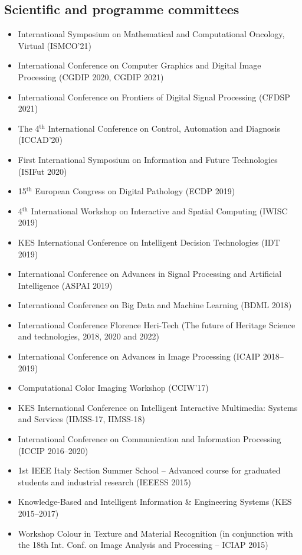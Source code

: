 \documentclass[11pt]{article}
\begin{document}
\subsection*{Scientific and programme committees}

\begin{itemize}
	\item International Symposium on Mathematical and Computational Oncology, Virtual (ISMCO'21)
	\item International Conference on Computer Graphics and Digital Image Processing (CGDIP 2020, CGDIP 2021)
	\item International Conference on Frontiers of Digital Signal Processing (CFDSP 2021)
  \item The 4$^\text{th}$ International Conference on Control, Automation and Diagnosis (ICCAD'20)
  \item First International Symposium on Information and Future Technologies (ISIFut 2020)
  \item 15$^\text{th}$ European Congress on Digital Pathology (ECDP 2019)
	\item 4$^\text{th}$ International Workshop on Interactive and Spatial Computing (IWISC 2019)
  \item KES International Conference on Intelligent Decision Technologies (IDT 2019)
  \item International Conference on Advances in Signal Processing and Artificial Intelligence (ASPAI 2019)
  \item International Conference on Big Data and Machine Learning (BDML 2018)
  \item International Conference Florence Heri-Tech (The future of Heritage Science and technologies, 2018, 2020 and 2022)
  \item International Conference on Advances in Image Processing (ICAIP 2018--2019)
  \item Computational Color Imaging Workshop (CCIW'17)
	\item KES International Conference on Intelligent Interactive Multimedia: Systems and Services (IIMSS-17, IIMSS-18)
  \item International Conference on Communication and Information Processing (ICCIP 2016--2020)
  \item 1st IEEE Italy Section Summer School – Advanced course for graduated students and industrial research (IEEESS 2015)
  \item Knowledge-Based and Intelligent Information \& Engineering Systems (KES 2015--2017)
  \item Workshop Colour in Texture and Material Recognition (in conjunction with the 18th Int. Conf. on Image Analysis and Processing – ICIAP 2015)

\end{itemize}
\end{document}
